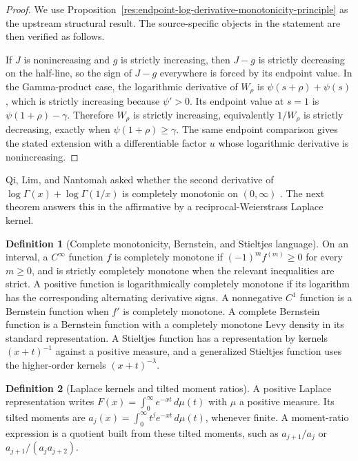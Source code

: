 \documentclass[11pt]{article}
\numberwithin{equation}{section}
\theoremstyle{definition}
\newtheorem{definition}{Definition}[section]
\theoremstyle{remark}
\newcommand{\1}{\mathbf 1}
\begin{document}
\begin{proof}
We use Proposition~\ref{res:endpoint-log-derivative-monotonicity-principle} as the upstream structural result. The source-specific objects in the statement are then verified as follows.

If \(J\) is nonincreasing and \(g\) is strictly increasing, then \(J-g\) is strictly decreasing on the half-line, so the sign of \(J-g\) everywhere is forced by its endpoint value. In the Gamma-product case, the logarithmic derivative of \(W_\rho\) is \(\psi(s+\rho)+\psi(s)\), which is strictly increasing because \(\psi'>0\). Its endpoint value at \(s=1\) is \(\psi(1+\rho)-\gamma\). Therefore \(W_\rho\) is strictly increasing, equivalently \(1/W_\rho\) is strictly decreasing, exactly when \(\psi(1+\rho)\ge\gamma\). The same endpoint comparison gives the stated extension with a differentiable factor \(u\) whose logarithmic derivative is nonincreasing.
\end{proof}

Qi, Lim, and Nantomah asked whether the second derivative of \(\log\Gamma(x)+\log\Gamma(1/x)\) is completely monotonic on \((0,\infty)\) \cite{qi-lim-nantomah-polygamma}.  The next theorem answers this in the affirmative by a reciprocal-Weierstrass Laplace kernel.

\begin{definition}[Complete monotonicity, Bernstein, and Stieltjes language]
\label{res:complete-monotonicity-bernstein-stieltjes-language}
On an interval, a \(C^\infty\) function \(f\) is completely monotone if \((-1)^m f^{(m)}\ge0\) for every \(m\ge0\), and is strictly completely monotone when the relevant inequalities are strict. A positive function is logarithmically completely monotone if its logarithm has the corresponding alternating derivative signs. A nonnegative \(C^1\) function is a Bernstein function when \(f'\) is completely monotone. A complete Bernstein function is a Bernstein function with a completely monotone Levy density in its standard representation. A Stieltjes function has a representation by kernels \((x+t)^{-1}\) against a positive measure, and a generalized Stieltjes function uses the higher-order kernels \((x+t)^{-\lambda}\).
\end{definition}

\begin{definition}[Laplace kernels and tilted moment ratios]
\label{res:laplace-kernel-and-tilted-moment-language}
A positive Laplace representation writes \(F(x)=\int_0^\infty e^{-xt}\,d\mu(t)\) with \(\mu\) a positive measure. Its tilted moments are \(a_j(x)=\int_0^\infty t^j e^{-xt}\,d\mu(t)\), whenever finite. A moment-ratio expression is a quotient built from these tilted moments, such as \(a_{j+1}/a_j\) or \(a_{j+1}/(a_ja_{j+2})\).
\end{definition}
\end{document}
